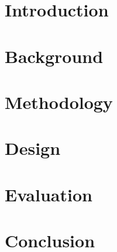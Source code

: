 \documentclass{report}
\begin{document}
\chapter{Introduction}


\chapter{Background}


\chapter{Methodology}


\chapter{Design}


\chapter{Evaluation}


\chapter{Conclusion}

\end{document}
